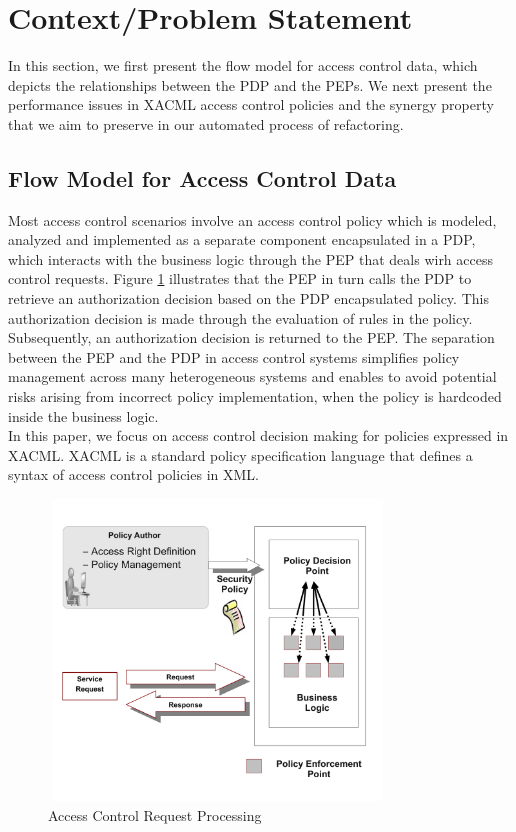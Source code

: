 \section{Context/Problem Statement} \label{sec:context}

In this section, we first present the flow model for access control data, which depicts the relationships between the PDP and the PEPs.
We next present the performance issues in XACML access control policies and the synergy property that we aim to preserve in our automated process 
of refactoring.

\subsection{Flow Model for Access Control Data}

Most access control scenarios involve an access control policy which is modeled, analyzed and implemented as a separate component
 encapsulated in a PDP, which interacts with the business logic through the PEP that deals wirh access control requests. 
Figure \ref{pep-pdp} illustrates that the PEP in turn calls the PDP to retrieve an authorization decision based on the PDP encapsulated
policy. This authorization decision is made through the evaluation of rules in the policy. 
Subsequently, an authorization decision is returned to the PEP.
The separation between the PEP and the PDP in access control systems simplifies policy management across many heterogeneous systems and enables to avoid
 potential risks arising from incorrect policy implementation, when the policy is hardcoded inside the business logic.
\\
In this paper, we focus on access control decision making for policies expressed in XACML.
XACML \cite{sunxacml} is a standard policy specification language that defines a syntax of access control policies in XML.

\begin{figure}[!h]
\begin{center}
\includegraphics[width=9cm, height=8cm]{business-logic}
\caption{Access Control Request Processing}
\label{pep-pdp}
\end{center}
\end{figure}

